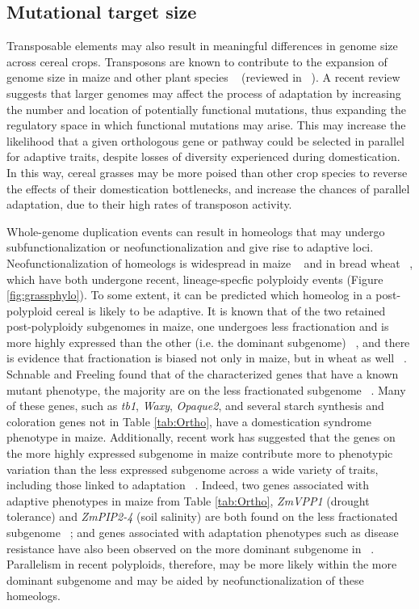 \documentclass[12pt]{article}
\begin{document}
\subsection*{Mutational target size}
Transposable elements may also result in meaningful differences in genome size across cereal crops.
Transposons are known to contribute to the expansion of genome size in maize and other plant species ~\citep{Tenaillon2011} (reviewed in ~\citep{Lisch2013}).
A recent review ~\citep{Mei2018} suggests that larger genomes may affect the process of adaptation by increasing the number and location of potentially functional mutations, thus expanding the regulatory space in which functional mutations may arise.
This may increase the likelihood that a given orthologous gene or pathway could be selected in parallel for adaptive traits, despite losses of diversity experienced during domestication.
In this way, cereal grasses may be more poised than other crop species to reverse the effects of their domestication bottlenecks, and increase the chances of parallel adaptation, due to their high rates of transposon activity. 

 
Whole-genome duplication events can result in homeologs that may undergo subfunctionalization or neofunctionalization and give rise to adaptive loci.
Neofunctionalization of homeologs is widespread in maize ~\citep{Hughes2014} and in bread wheat ~\citep{Pfeifer2014}, which have both undergone recent, lineage-specfic polyploidy events (Figure \ref{fig:grassphylo}).
To some extent, it can be predicted which homeolog in a post-polyploid cereal is likely to be adaptive.
It is known that of the two retained post-polyploidy subgenomes in maize, one undergoes less fractionation and is more highly expressed than the other (i.e. the dominant subgenome) ~\citep{Woodhouse2010, Schnable2011}, and there is evidence that fractionation is biased not only in maize, but in wheat as well ~\citep{Eckardt2014}.
Schnable and Freeling found that of the characterized genes that have a known mutant phenotype, the majority are on the less fractionated subgenome ~\citep{Schnable20112}.
Many of these genes, such as \textit{tb1}, \textit{Waxy}, \textit{Opaque2}, and several starch synthesis and coloration genes not in Table \ref{tab:Ortho}, have a domestication syndrome phenotype in maize.
Additionally, recent work has suggested that the genes on the more highly expressed subgenome in maize contribute more to phenotypic variation than the less expressed subgenome across a wide variety of traits, including those linked to adaptation ~\citep{RennyByfield2017}.
Indeed, two genes associated with adaptive phenotypes in maize from Table \ref{tab:Ortho}, \textit{ZmVPP1} (drought tolerance) and \textit{ZmPIP2-4} (soil salinity) are both found on the less fractionated subgenome ~\citep{Schnable20112}; and genes associated with adaptation phenotypes such as disease resistance have also been observed on the more dominant subgenome in ~\citep{RennyByfield2017}. 
Parallelism in recent polyploids, therefore, may be more likely within the more dominant subgenome and may be aided by neofunctionalization of these homeologs.
\end{document}
